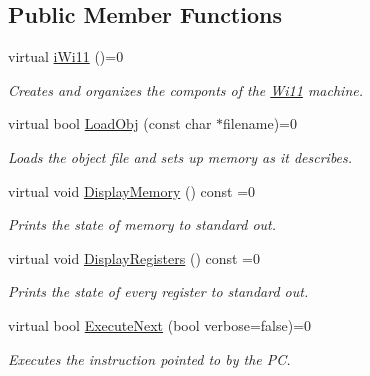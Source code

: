 \subsection*{Public Member Functions}
\begin{DoxyCompactItemize}
\item 
virtual \hyperlink{classiWi11_a379b2619c928a8dde1df28d596440ec0}{iWi11} ()=0
\begin{DoxyCompactList}\small\item\em Creates and organizes the componts of the \hyperlink{classWi11}{Wi11} machine. \item\end{DoxyCompactList}\item 
virtual bool \hyperlink{classiWi11_a87f8cd9014f7ae2edaa8928257fc84e9}{LoadObj} (const char $\ast$filename)=0
\begin{DoxyCompactList}\small\item\em Loads the object file and sets up memory as it describes. \item\end{DoxyCompactList}\item 
virtual void \hyperlink{classiWi11_ad9b13831ad9a83a8abbc3a77794b38bc}{DisplayMemory} () const =0
\begin{DoxyCompactList}\small\item\em Prints the state of memory to standard out. \item\end{DoxyCompactList}\item 
virtual void \hyperlink{classiWi11_a143e669e3c7f46c3d1524838c8d74d94}{DisplayRegisters} () const =0
\begin{DoxyCompactList}\small\item\em Prints the state of every register to standard out. \item\end{DoxyCompactList}\item 
virtual bool \hyperlink{classiWi11_ae502d86eb25fe6e1169e800939362074}{ExecuteNext} (bool verbose=false)=0
\begin{DoxyCompactList}\small\item\em Executes the instruction pointed to by the PC. \item\end{DoxyCompactList}\end{DoxyCompactItemize}
